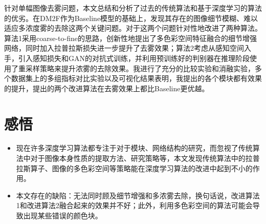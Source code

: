 \documentclass{article}
\begin{document}
针对单幅图像去雾问题，本文总结和分析了过去的传统算法和基于深度学习的算法的优劣。在DM2F作为Baseline模型的基础上，发现其存在的图像细节模糊、难以适应多浓度雾的去除这两个关键问题。对于这两个问题针对性地改进了两种算法。算法1采用coarse-to-fine的思路，创新性地提出了多色彩空间特征融合的细节增强网络，同时加入拉普拉斯损失进一步提升了去雾效果；算法2考虑从感知空间入手，引入感知损失和GAN的对抗式训练，并利用预训练好的判别器在推理阶段使用了重采样策略来提升浓雾的去除效果。我进行了充分的比较实验和消融实验，多个数据集上的多组指标对比实验以及可视化结果表明，我提出的各个模块都有效果的提升，提出的两个改进算法在去雾效果上都比Baseline更优越。

\section{感悟}
\begin{itemize}
  \item 现在许多深度学习算法都专注于对于模块、网络结构的研究，而忽视了传统算法中对于图像本身性质的提取方法、研究策略等，本文发现传统算法中的拉普拉斯算子、图像的多色彩空间等策略能在深度学习算法的改进中起到不小的作用。
  \item 本文存在的缺陷：无法同时顾及细节增强和多浓雾去除，换句话说，改进算法1和改进算法2融合起来的效果并不好；此外，利用多色彩空间的算法可能会导致出现某些错误的颜色块。
\end{itemize}


\end{document}
